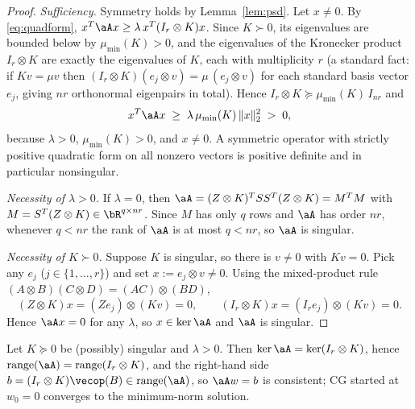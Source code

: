 \begin{proof}
\emph{Sufficiency.} Symmetry holds by Lemma~\ref{lem:psd}. Let $x\neq0$.
By \eqref{eq:quadform},
$x^{T}\aA x \ge \lambda\,x^{T}(I_r\otimes K)x$. Since $K\succ0$, its
eigenvalues are bounded below by $\mu_{\min}(K)>0$, and the eigenvalues of the
Kronecker product $I_r\otimes K$ are exactly the eigenvalues of $K$, each with
multiplicity $r$ (a standard fact: if $K v=\mu v$ then
$(I_r\otimes K)(e_j\otimes v)=\mu\,(e_j\otimes v)$ for each standard basis
vector $e_j$, giving $nr$ orthonormal eigenpairs in total). Hence
$I_r\otimes K\succeq \mu_{\min}(K)\,I_{nr}$ and
\[
  x^{T}\aA x \;\ge\; \lambda\,\mu_{\min}(K)\,\|x\|_2^{2} \;>\;0 ,
\]
because $\lambda>0$, $\mu_{\min}(K)>0$, and $x\neq0$. A symmetric operator
with strictly positive quadratic form on all nonzero vectors is positive
definite and in particular nonsingular.

\smallskip
\emph{Necessity of $\lambda>0$.} If $\lambda=0$, then
$\aA = (Z\otimes K)^{T}SS^{T}(Z\otimes K) = M^{T}M$ with
$M=S^{T}(Z\otimes K)\in\bR^{q\times nr}$. Since $M$ has only $q$ rows and
$\aA$ has order $nr$, whenever $q<nr$ the rank of $\aA$ is at most $q<nr$, so
$\aA$ is singular.

\smallskip
\emph{Necessity of $K\succ0$.} Suppose $K$ is singular, so there is
$v\neq0$ with $Kv=0$. Pick any $e_j$ ($j\in\{1,\dots,r\}$) and set
$x:=e_j\otimes v\neq0$. Using the mixed-product rule
$(A\otimes B)(C\otimes D)=(AC)\otimes(BD)$,
\[
  (Z\otimes K)x=(Ze_j)\otimes(Kv)=0,
  \qquad
  (I_r\otimes K)x=(I_r e_j)\otimes(Kv)=0 .
\]
Hence $\aA x=0$ for any $\lambda$, so $x\in\ker\aA$ and $\aA$ is singular.
\end{proof}

\begin{lemma}
\label{lem:singular}
Let $K\succeq0$ be (possibly) singular and $\lambda>0$. Then
$\ker\aA=\ker(I_r\otimes K)$, hence
$\operatorname{range}(\aA)=\operatorname{range}(I_r\otimes K)$, and the
right-hand side $b=(I_r\otimes K)\vecop(B)\in\operatorname{range}(\aA)$, so
$\aA w=b$ is consistent; CG started at $w_0=0$ converges to the minimum-norm
solution.
\end{lemma}


